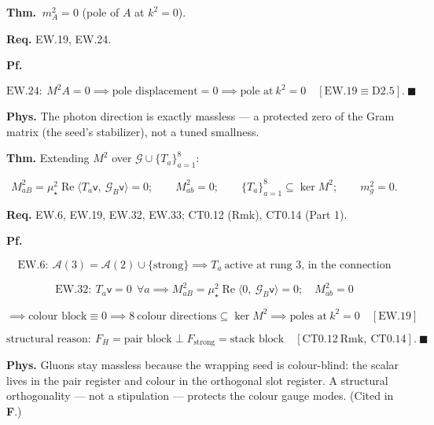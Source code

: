 \begin{theorem}\label{tag:EW-25}
\textbf{Thm.} $\ m_A^2=0$ (pole of $A$ at $k^2=0$).

\textbf{Req.} EW.19, EW.24.

\textbf{Pf.}

\[
\mathrm{EW.24}:\ M^2A=0\implies\text{pole displacement}=0\implies\text{pole at}\ k^2=0\quad[\mathrm{EW.19}\equiv\mathrm{D2.5}].\ \blacksquare
\]

\textbf{Phys.} The photon direction is exactly massless — a protected zero of the Gram matrix (the seed’s stabilizer), not a tuned smallness.

\end{theorem}

\begin{theorem}\label{tag:EW-26}
\textbf{Thm.} Extending $M^2$ over $\mathcal G\cup\{T_a\}_{a=1}^{8}$:

\[
M^2_{aB}=\mu_\star^2\operatorname{Re}\langle T_a\mathsf v,\ \mathcal G_B\mathsf v\rangle=0;\qquad
M^2_{ab}=0;\qquad
\{T_a\}_{a=1}^8\subseteq\ker M^2;\qquad
m_g^2=0 .
\]

\textbf{Req.} EW.6, EW.19, EW.32, EW.33; CT0.12 (Rmk), CT0.14 (Part 1).

\textbf{Pf.}

\[
\mathrm{EW.6}:\ \mathcal A(3)=\mathcal A(2)\cup\{\mathrm{strong}\}\implies T_a\ \text{active at rung 3, in the connection}
\]

\[
\mathrm{EW.32}:\ T_a\mathsf v=0\ \ \forall a\implies M^2_{aB}=\mu_\star^2\operatorname{Re}\langle0,\ \mathcal G_B\mathsf v\rangle=0;\quad M^2_{ab}=0
\]

\[
\implies\text{colour block}\equiv0\implies8\ \text{colour directions}\subseteq\ker M^2\implies\text{poles at}\ k^2=0\quad[\mathrm{EW.19}]
\]

\[
\text{structural reason}:\ F_H=\text{pair block}\perp F_{\mathrm{strong}}=\text{stack block}\quad[\mathrm{CT0.12\ Rmk},\ \mathrm{CT0.14}].\ \blacksquare
\]

\textbf{Phys.} Gluons stay massless because the wrapping seed is colour-blind: the scalar lives in the pair register and colour in the orthogonal slot register. A structural orthogonality — not a stipulation — protects the colour gauge modes. (Cited in \textbf{F}.)

\end{theorem}

